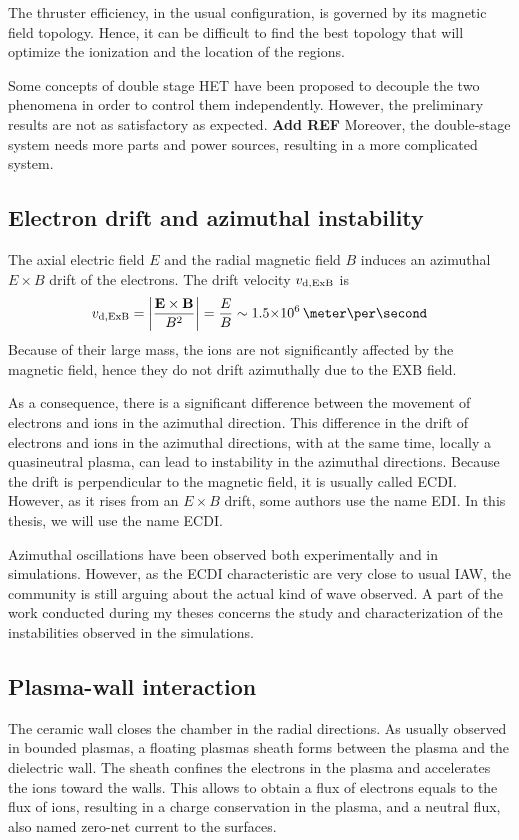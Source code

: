 The thruster efficiency, in the usual configuration, is governed by its magnetic field topology.
Hence, it can be difficult to find the best topology that will optimize the ionization and the location of the regions.

Some concepts of double stage \ac{HET} have been proposed to decouple the two phenomena in order to control them independently.
However, the preliminary results are not as satisfactory as expected. {\bf Add REF}
Moreover, the double-stage system needs more parts and power sources, resulting in a more complicated system.

\subsection{Electron drift and azimuthal instability}
The axial electric field $E$ and the radial magnetic field $B$ induces an azimuthal $E\times B$ drift of the electrons.
The drift velocity $v_{\rm d, ExB}$ is 
\begin{equation} \label{eq-exbdrift}
  v_{\rm d, ExB} = \bigg\lvert \frac{\vect{E} \times \vect{B}}{B^2} \bigg\rvert = \frac{E}{B} \sim \sn{1.5}{6} \,\meter\per\second
\end{equation}
Because of their large mass, the ions are not significantly affected by the magnetic field, hence they do not drift azimuthally due to the EXB field.

As a consequence, there is a significant difference between the movement of electrons and ions in the azimuthal direction.
This difference in the drift of electrons and ions in the azimuthal directions, with at the same time, locally a quasineutral plasma, can lead to instability in the azimuthal directions.
Because the drift is perpendicular to the magnetic field, it is usually called \ac{ECDI}.
However, as it rises from an $E\times B$ drift, some authors use the name \ac{EDI}.
In this thesis, we will use the name \ac{ECDI}.

Azimuthal oscillations have been observed both experimentally and in simulations.
However, as the \ac{ECDI} characteristic are very close to usual \ac{IAW}, the community is still arguing about the actual kind of wave observed.
A part of the work conducted during my theses concerns the study and characterization of the instabilities observed in the simulations.

\subsection{Plasma-wall interaction}
The ceramic wall closes the chamber in the radial directions.
As usually observed in bounded plasmas, a floating plasmas sheath forms between the plasma and the dielectric wall.
The sheath confines the electrons in the plasma and accelerates the ions toward the walls.
This allows to obtain a flux of electrons equals to the flux of ions, resulting in a charge conservation in the plasma, and a neutral flux, also named zero-net current to the surfaces.

